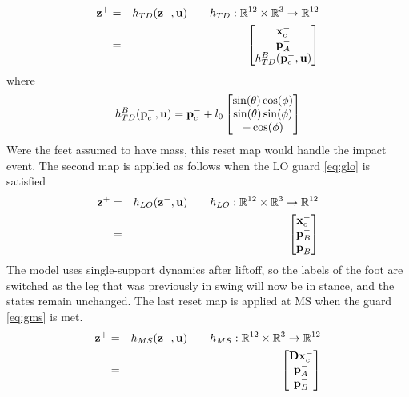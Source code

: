 \begin{eqnarray}
	\mathbf{z}^+ &=& h_{TD}(\mathbf{z}^-,\mathbf{u}) \qquad h_{TD}:\mathbb{R}^{12}\times \mathbb{R}^{3 }  \rightarrow \mathbb{R}^{12} \\
	{}	&=& \begin{bmatrix}
		\mathbf{x}_{c}^- \\
		\mathbf{p}_{A}^- \\
		h_{TD}^{B}(\mathbf{p}_{c}^-, \mathbf{u})
	\end{bmatrix} \nonumber
\end{eqnarray}
where
\begin{equation}
	h_{TD}^{B}(\p_{c}^-, \u) = \p_{c}^- + l_0%
	\begin{bmatrix}
		\sin(\theta)\cos(\phi)\\
		\sin(\theta)\sin(\phi)\\
		-\cos(\phi)
	\end{bmatrix}
\end{equation}
Were the feet assumed to have mass, this reset map would handle the impact event. The second map is applied as follows when the LO guard \eqref{eq:glo} is satisfied
%
\begin{eqnarray}
	\mathbf{z}^+ &=& h_{LO}(\mathbf{z}^-,\mathbf{u}) \qquad h_{LO}:\mathbb{R}^{12} \times \mathbb{R}^{3} \rightarrow \mathbb{R}^{12} \\
	{}	&=& \begin{bmatrix}
		\mathbf{x}_{c}^- \\
		\mathbf{p}_{B}^- \\
		\mathbf{p}_{B}^-
	\end{bmatrix} \nonumber
\end{eqnarray}
The model uses single-support dynamics after liftoff, so the labels of the foot are switched as the leg that was previously in swing will now be in stance, and the states remain unchanged. The last reset map is applied at MS when the guard \eqref{eq:gms} is met.
%
\begin{eqnarray}
	\mathbf{z}^+ &=& h_{MS}(\mathbf{z}^-,\mathbf{u}) \qquad h_{MS}:\mathbb{R}^{12}\times  \mathbb{R}^{3} \rightarrow \mathbb{R}^{12} \\
	{}	&=& \begin{bmatrix}
		\mathbf{D}\mathbf{x}_{c}^- \\
		\mathbf{p}_{A}^- \\
		\mathbf{p}_{B}^-
	\end{bmatrix} \nonumber
\end{eqnarray}
